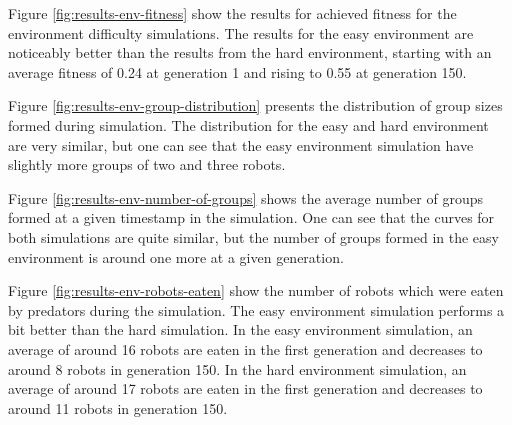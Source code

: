 \vspace*{\fill}

Figure \ref{fig:results-env-fitness} show the results for achieved fitness for the environment difficulty simulations.
The results for the easy environment are noticeably better than the results from the hard environment, starting with an average fitness of 0.24 at generation 1 and rising to 0.55 at generation 150. 




Figure \ref{fig:results-env-group-distribution} presents the distribution of group sizes formed during simulation. The distribution for the easy and hard environment are very similar, but one can see that the easy environment simulation have slightly more groups of two and three robots.
	

\newpage

\vspace*{\fill}

Figure \ref{fig:results-env-number-of-groups} shows the average number of groups formed at a given timestamp in the simulation.
One can see that the curves for both simulations are quite similar, but the number of groups formed in the easy environment is around one more at a given generation.
	
\vspace*{\fill}
\newpage
\vspace*{\fill}


Figure \ref{fig:results-env-robots-eaten} show the number of robots which were eaten by predators during the simulation.
The easy environment simulation performs a bit better than the hard simulation.
In the easy environment simulation, an average of around 16 robots are eaten in the first generation and decreases to around 8 robots in generation 150.
In the hard environment simulation, an average of around 17 robots are eaten in the first generation and decreases to around 11 robots in generation 150.

